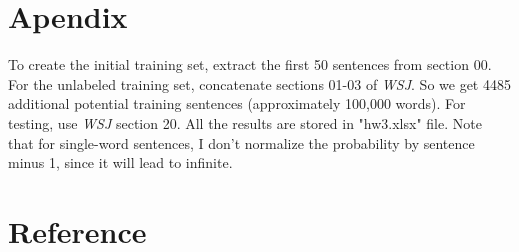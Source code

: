 \documentclass[winfonts,UTF8]{article}
\begin{document}
\section{Apendix} \label{appendix}


To create the initial training set, extract the first 50 sentences from section 00. For the unlabeled training set, concatenate sections 01-03 of \emph{WSJ}. So we get 4485 additional potential training sentences (approximately 100,000 words). For testing, use \emph{WSJ} section 20. All the results are stored in "hw3.xlsx" file. Note that for single-word sentences, I don't normalize the probability by sentence minus 1, since it will lead to infinite.



\section{Reference}
\renewcommand\refname{\vskip -0.25cm}
\refname


\end{document}
